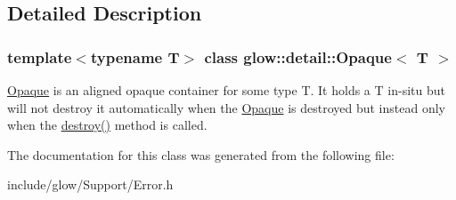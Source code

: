 \subsection{Detailed Description}
\subsubsection*{template$<$typename T$>$\newline
class glow\+::detail\+::\+Opaque$<$ T $>$}

\hyperlink{classglow_1_1detail_1_1_opaque}{Opaque} is an aligned opaque container for some type T. It holds a T in-\/situ but will not destroy it automatically when the \hyperlink{classglow_1_1detail_1_1_opaque}{Opaque} is destroyed but instead only when the \hyperlink{classglow_1_1detail_1_1_opaque_a37e4e7cd281675522c2332c24b894003}{destroy()} method is called. 

The documentation for this class was generated from the following file\+:\begin{DoxyCompactItemize}
\item 
include/glow/\+Support/Error.\+h\end{DoxyCompactItemize}
